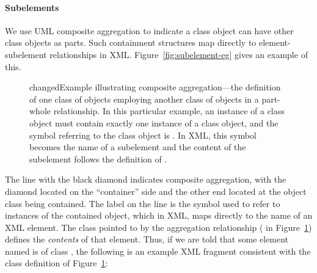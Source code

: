 \begin{blockChanged}
\paragraph{Subelements}

We use UML composite aggregation to indicate a class object can
have other class objects as parts.  Such containment structures
map directly to element-subelement relationships in XML.
Figure~\ref{fig:subelement-eg} gives an example of this.

\begin{figure}[htb]
  \centering
  \small
  \vspace*{-1ex}
  \caption{changed{Example illustrating composite
      aggregation---the definition of one class of objects
      employing another class of objects in a part-whole
      relationship.  In this particular example, an instance of a
       class object must contain exactly one instance
      of a  class object, and the symbol referring to
      the  class object is .  In XML,
      this symbol becomes the name of a subelement and the content
      of the subelement follows the definition of .}}
  \label{fig:container-eg}
\end{figure}

The line with the black diamond indicates composite aggregation,
with the diamond located on the ``container'' side and the other
end located at the object class being contained.  The label on the
line is the symbol used to refer to instances of the contained
object, which in XML, maps directly to the name of an XML element.
The class pointed to by the aggregation relationship (
in Figure~\ref{fig:container-eg}) defines the \emph{contents} of
that element.  Thus, if we are told that some element named
 is of class , the following is an
example XML fragment consistent with the class definition of
Figure~\ref{fig:container-eg}:


\end{blockChanged}
